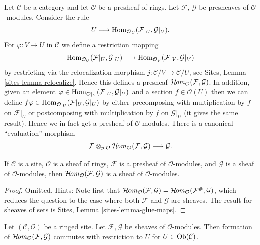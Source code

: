 \noindent
Let $\mathcal{C}$ be a category and let $\mathcal{O}$ be a presheaf
of rings. Let $\mathcal{F}$, $\mathcal{G}$ be presheaves of
$\mathcal{O}$-modules. Consider the rule
$$
U \longmapsto \mathop{\mathrm{Hom}}\nolimits_{\mathcal{O}_U}(\mathcal{F}|_U, \mathcal{G}|_U).
$$
For $\varphi : V \to U$ in $\mathcal{C}$ we define a restriction mapping
$$
\mathop{\mathrm{Hom}}\nolimits_{\mathcal{O}_U}(\mathcal{F}|_U, \mathcal{G}|_U)
\longrightarrow
\mathop{\mathrm{Hom}}\nolimits_{\mathcal{O}_V}(\mathcal{F}|_V, \mathcal{G}|_V)
$$
by restricting via the relocalization morphism
$j : \mathcal{C}/V \to \mathcal{C}/U$, see
Sites, Lemma \ref{sites-lemma-relocalize}. Hence this defines a
presheaf $\mathop{\mathcal{H}\!\mathit{om}}\nolimits_\mathcal{O}(\mathcal{F}, \mathcal{G})$.
In addition, given an element
$\varphi \in \mathop{\mathrm{Hom}}\nolimits_{\mathcal{O}|_U}(\mathcal{F}|_U, \mathcal{G}|_U)$
and a section $f \in \mathcal{O}(U)$ then we can define
$f\varphi \in \mathop{\mathrm{Hom}}\nolimits_{\mathcal{O}|_U}(\mathcal{F}|_U, \mathcal{G}|_U)$
by either precomposing with multiplication by $f$ on $\mathcal{F}|_U$
or postcomposing with multiplication by $f$ on $\mathcal{G}|_U$ (it gives
the same result). Hence we in fact get a presheaf of $\mathcal{O}$-modules.
There is a canonical ``evaluation'' morphism
$$
\mathcal{F}
\otimes_{p, \mathcal{O}}
\mathop{\mathcal{H}\!\mathit{om}}\nolimits_\mathcal{O}(\mathcal{F}, \mathcal{G})
\longrightarrow
\mathcal{G}.
$$

\begin{lemma}
\label{lemma-internal-hom}
If $\mathcal{C}$ is a site, $\mathcal{O}$ is a sheaf of rings,
$\mathcal{F}$ is a presheaf of $\mathcal{O}$-modules, and
$\mathcal{G}$ is a sheaf of $\mathcal{O}$-modules, then
$\mathop{\mathcal{H}\!\mathit{om}}\nolimits_\mathcal{O}(\mathcal{F}, \mathcal{G})$
is a sheaf of $\mathcal{O}$-modules.
\end{lemma}

\begin{proof}
Omitted. Hints: Note first that
$\mathop{\mathcal{H}\!\mathit{om}}\nolimits_\mathcal{O}(\mathcal{F}, \mathcal{G})
= \mathop{\mathcal{H}\!\mathit{om}}\nolimits_\mathcal{O}(\mathcal{F}^\#, \mathcal{G})$, which reduces
the question to the case where both $\mathcal{F}$ and $\mathcal{G}$
are sheaves. The result for sheaves of sets is
Sites, Lemma \ref{sites-lemma-glue-maps}.
\end{proof}

\begin{lemma}
\label{lemma-internal-hom-restriction}
Let $(\mathcal{C}, \mathcal{O})$ be a ringed site.
Let $\mathcal{F}, \mathcal{G}$ be sheaves of $\mathcal{O}$-modules.
Then formation of $\mathop{\mathcal{H}\!\mathit{om}}\nolimits_\mathcal{O}(\mathcal{F}, \mathcal{G})$
commutes with restriction to $U$ for $U \in \mathop{\mathrm{Ob}}\nolimits(\mathcal{C})$.
\end{lemma}

